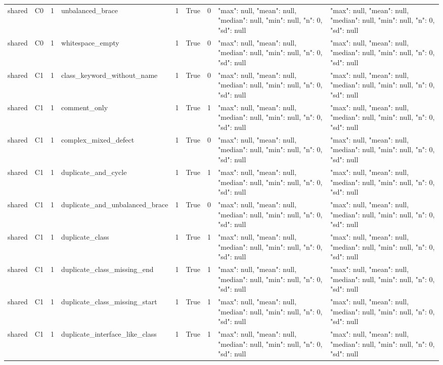 \begin{tabular}{lllllllll}
shared & C0 & 1 & unbalanced\_brace & 1 & True & 0 & {"max": null, "mean": null, "median": null, "min": null, "n": 0, "sd": null} & {"max": null, "mean": null, "median": null, "min": null, "n": 0, "sd": null} \\
shared & C0 & 1 & whitespace\_empty & 1 & True & 0 & {"max": null, "mean": null, "median": null, "min": null, "n": 0, "sd": null} & {"max": null, "mean": null, "median": null, "min": null, "n": 0, "sd": null} \\
shared & C1 & 1 & class\_keyword\_without\_name & 1 & True & 0 & {"max": null, "mean": null, "median": null, "min": null, "n": 0, "sd": null} & {"max": null, "mean": null, "median": null, "min": null, "n": 0, "sd": null} \\
shared & C1 & 1 & comment\_only & 1 & True & 1 & {"max": null, "mean": null, "median": null, "min": null, "n": 0, "sd": null} & {"max": null, "mean": null, "median": null, "min": null, "n": 0, "sd": null} \\
shared & C1 & 1 & complex\_mixed\_defect & 1 & True & 0 & {"max": null, "mean": null, "median": null, "min": null, "n": 0, "sd": null} & {"max": null, "mean": null, "median": null, "min": null, "n": 0, "sd": null} \\
shared & C1 & 1 & duplicate\_and\_cycle & 1 & True & 1 & {"max": null, "mean": null, "median": null, "min": null, "n": 0, "sd": null} & {"max": null, "mean": null, "median": null, "min": null, "n": 0, "sd": null} \\
shared & C1 & 1 & duplicate\_and\_unbalanced\_brace & 1 & True & 0 & {"max": null, "mean": null, "median": null, "min": null, "n": 0, "sd": null} & {"max": null, "mean": null, "median": null, "min": null, "n": 0, "sd": null} \\
shared & C1 & 1 & duplicate\_class & 1 & True & 1 & {"max": null, "mean": null, "median": null, "min": null, "n": 0, "sd": null} & {"max": null, "mean": null, "median": null, "min": null, "n": 0, "sd": null} \\
shared & C1 & 1 & duplicate\_class\_missing\_end & 1 & True & 1 & {"max": null, "mean": null, "median": null, "min": null, "n": 0, "sd": null} & {"max": null, "mean": null, "median": null, "min": null, "n": 0, "sd": null} \\
shared & C1 & 1 & duplicate\_class\_missing\_start & 1 & True & 1 & {"max": null, "mean": null, "median": null, "min": null, "n": 0, "sd": null} & {"max": null, "mean": null, "median": null, "min": null, "n": 0, "sd": null} \\
shared & C1 & 1 & duplicate\_interface\_like\_class & 1 & True & 1 & {"max": null, "mean": null, "median": null, "min": null, "n": 0, "sd": null} & {"max": null, "mean": null, "median": null, "min": null, "n": 0, "sd": null} \\

\end{tabular}
